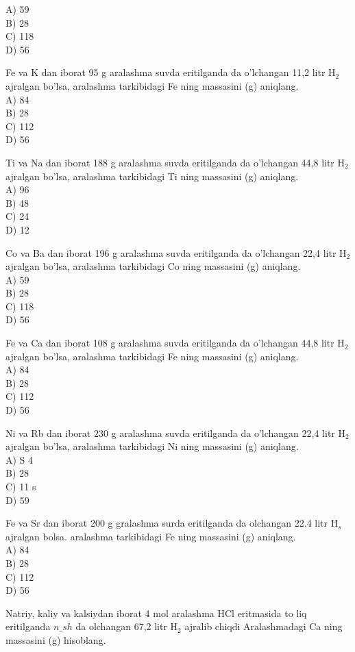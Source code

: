 A) 59\\
B) 28\\
C) 118\\
D) 56
  \item Fe va K dan iborat 95 g aralashma suvda eritilganda da o'lchangan 11,2 litr $\mathrm{H}_{2}$ ajralgan bo'lsa, aralashma tarkibidagi Fe ning massasini (g) aniqlang.\\
A) 84\\
B) 28\\
C) 112\\
D) 56
  \item Ti va Na dan iborat 188 g aralashma suvda eritilganda da o'lchangan 44,8 litr $\mathrm{H}_{2}$ ajralgan bo'lsa, aralashma tarkibidagi Ti ning massasini (g) aniqlang.\\
A) 96\\
B) 48\\
C) 24\\
D) 12
  \item Co va Ba dan iborat 196 g aralashma suvda eritilganda da o'lchangan 22,4 litr $\mathrm{H}_{2}$ ajralgan bo'lsa, aralashma tarkibidagi Co ning massasini (g) aniqlang.\\
A) 59\\
B) 28\\
C) 118\\
D) 56
  \item Fe va Ca dan iborat 108 g aralashma suvda eritilganda da o'lchangan 44,8 litr $\mathrm{H}_{2}$ ajralgan bo'lsa, aralashma tarkibidagi Fe ning massasini (g) aniqlang.\\
A) 84\\
B) 28\\
C) 112\\
D) 56
  \item Ni va Rb dan iborat 230 g aralashma suvda eritilganda da o'lchangan 22,4 litr $\mathrm{H}_{2}$ ajralgan bo'lsa, aralashma tarkibidagi Ni ning massasini (g) aniqlang.\\
A) S 4\\
B) 28\\
C) 11 s\\
D) 59
  \item Fe va Sr dan iborat 200 g gralashma surda eritilganda da olchangan 22.4 litr $\mathrm{H}_{s}$ ajralgan bolsa. aralashma tarkibidagi Fe ning massasini (g) aniqlang.\\
A) 84\\
B) 28\\
C) 112\\
D) 56
  \item Natriy, kaliy va kalsiydan iborat 4 mol aralashma HCl eritmasida to liq eritilganda $n \_s h$ da olchangan 67,2 litr $\mathrm{H}_{2}$ ajralib chiqdi Aralashmadagi Ca ning massasini (g) hisoblang.\\
